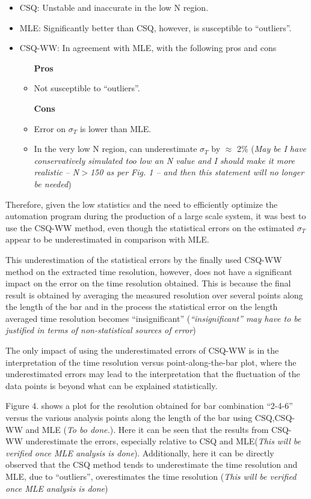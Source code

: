 \documentclass[12pt]{article}
\begin{document}
\begin{itemize}
	\item CSQ: Unstable and inaccurate in the low N region. 
	\item MLE: Significantly better than CSQ, however, is susceptible to ``outliers''.
	\item CSQ-WW: In agreement with MLE, with the following pros and cons
		\begin{itemize}
			\item [\textbf{Pros}]
			\item Not susceptible to ``outliers''.
		\end{itemize}
		\begin{itemize}
			\item [\textbf{Cons}]
			\item Error on $\sigma_{T}$ is lower than MLE.
			\item In the very low N region, can underestimate $\sigma_{T}$ by $\approx$ 2\% (\textit{May be I have conservatively simulated too low an N value and I should make it more realistic -- N$>$150 as per Fig. 1 -- and then this statement will no longer be needed})
		\end{itemize}
\end{itemize}

Therefore, given the low statistics and the need to efficiently optimize the automation program during the production of a large scale system, it was best to use the CSQ-WW method, even though the statistical errors on the estimated $\sigma_{T}$ appear to be underestimated in comparison with MLE.

This underestimation of the statistical errors by the finally used CSQ-WW method on the extracted time resolution, however, does not have a significant impact on the error on the time resolution obtained. This is because the final result is obtained by averaging the measured resolution over several points along the length of the bar and in the process the statistical error on the length averaged time resolution becomes ``insignificant'' (\textit{``insignificant'' may have to be justified in terms of non-statistical sources of error})

The only impact of using the underestimated errors of CSQ-WW is in the interpretation of the time resolution versus point-along-the-bar plot, where the underestimated errors may lead to the interpretation that the fluctuation of the data points is beyond what can be explained statistically. 

Figure 4. shows a plot for the resolution obtained for bar combination ``2-4-6'' versus the various analysis points along the length of the bar using CSQ,CSQ-WW and MLE (\textit{To bo done.}). Here it can be seen that the results from CSQ-WW underestimate the errors, especially relative to CSQ and MLE(\textit{This will be verified once MLE analysis is done}). Additionally, here it can be directly observed that the CSQ method tends to underestimate the time resolution and MLE, due to ``outliers'', overestimates the time resolution (\textit{This will be verified once MLE analysis is done}) 
\end{document}
